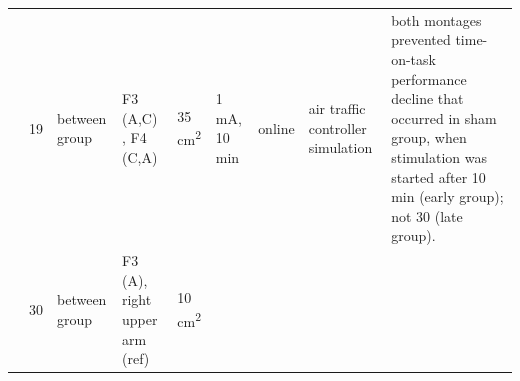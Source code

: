 \documentclass[11pt,]{memoir}
\begin{document}
\begin{longtable}[]{@{}lllllllll@{}}
\begin{minipage}[t]{0.08\columnwidth}\raggedright
\textcite{Nelson2014}\strut
\end{minipage} & \begin{minipage}[t]{0.02\columnwidth}\raggedright
19\strut
\end{minipage} & \begin{minipage}[t]{0.04\columnwidth}\raggedright
between
group\strut
\end{minipage} & \begin{minipage}[t]{0.13\columnwidth}\raggedright
F3 (A,C) , F4 (C,A)\strut
\end{minipage} & \begin{minipage}[t]{0.03\columnwidth}\raggedright
35
cm\textsuperscript{2}\strut
\end{minipage} & \begin{minipage}[t]{0.05\columnwidth}\raggedright
1 mA, 10
min\strut
\end{minipage} & \begin{minipage}[t]{0.06\columnwidth}\raggedright
online\strut
\end{minipage} & \begin{minipage}[t]{0.11\columnwidth}\raggedright
air traffic controller
simulation\strut
\end{minipage} & \begin{minipage}[t]{0.24\columnwidth}\raggedright
both montages prevented time-on-task performance
decline that occurred in sham group, when stimulation
was started after 10 min (early group); not 30 (late
group).\strut
\end{minipage}\tabularnewline
\begin{minipage}[t]{0.08\columnwidth}\raggedright
\textcite{McIntire2014}\strut
\end{minipage} & \begin{minipage}[t]{0.02\columnwidth}\raggedright
30\strut
\end{minipage} & \begin{minipage}[t]{0.04\columnwidth}\raggedright
between
group\strut
\end{minipage} & \begin{minipage}[t]{0.13\columnwidth}\raggedright
F3 (A), right upper arm (ref)\strut
\end{minipage} & \begin{minipage}[t]{0.03\columnwidth}\raggedright
10
cm\textsuperscript{2}\strut
\end{minipage} & \begin{minipage}[t]{0.05\columnwidth}\raggedright

\end{minipage}
\end{longtable}
\end{document}
